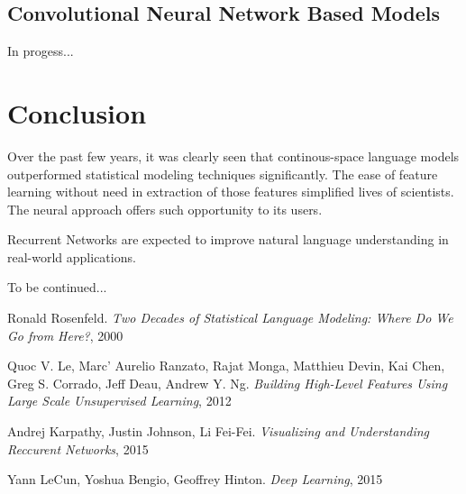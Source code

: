 \documentclass{IEEEtran}
\begin{document}
\subsection{Convolutional Neural Network Based Models}

In progess...

\section{Conclusion}

Over the past few years, it was clearly seen that continous-space language models outperformed statistical modeling techniques significantly. The ease of feature learning without need in extraction of those features simplified lives of scientists. The neural approach offers such opportunity to its users.

Recurrent Networks are expected to improve natural language understanding in real-world applications.

To be continued...






\begin{thebibliography}{5}

Ronald Rosenfeld. \emph{Two Decades of Statistical Language Modeling: Where Do We Go from Here?}, 2000

Quoc V. Le, Marc' Aurelio Ranzato, Rajat Monga, Matthieu Devin, Kai Chen, Greg S. Corrado, Jeff Deau, Andrew Y. Ng. \emph{Building High-Level Features Using Large Scale Unsupervised Learning}, 2012

Andrej Karpathy, Justin Johnson, Li Fei-Fei. \emph{Visualizing and Understanding Reccurent Networks}, 2015

Yann LeCun, Yoshua Bengio, Geoffrey Hinton. \emph{Deep Learning}, 2015

\end{thebibliography}
\end{document}
